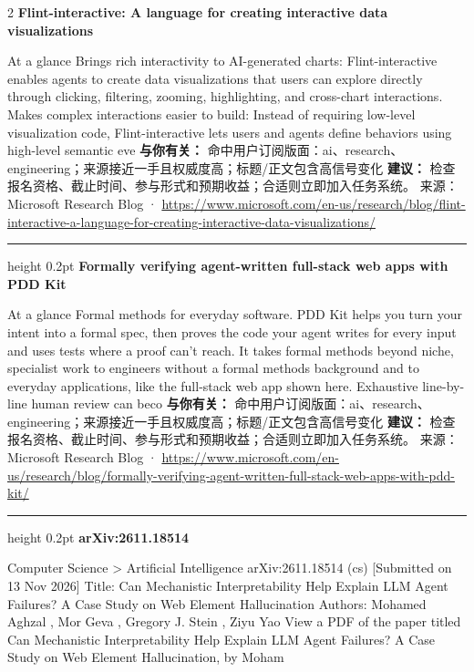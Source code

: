\documentclass[10.5pt]{ctexart}
\begin{document}
\begin{multicols}{2}
{\large\bfseries Flint-interactive: A language for creating interactive data visualizations}\par
At a glance Brings rich interactivity to AI-generated charts: Flint-interactive enables agents to create data visualizations that users can explore directly through clicking, filtering, zooming, highlighting, and cross-chart interactions. Makes complex interactions easier to build: Instead of requiring low-level visualization code, Flint-interactive lets users and agents define behaviors using high-level semantic eve
\textbf{与你有关：} 命中用户订阅版面：ai、research、engineering；来源接近一手且权威度高；标题/正文包含高信号变化
\textbf{建议：} 检查报名资格、截止时间、参与形式和预期收益；合适则立即加入任务系统。
{\footnotesize\color{ormuted} 来源：Microsoft Research Blog · \url{https://www.microsoft.com/en-us/research/blog/flint-interactive-a-language-for-creating-interactive-data-visualizations/}}
\vspace{2mm}
\hrule height 0.2pt
\vspace{2mm}
{\large\bfseries Formally verifying agent-written full-stack web apps with PDD Kit}\par
At a glance Formal methods for everyday software. PDD Kit helps you turn your intent into a formal spec, then proves the code your agent writes for every input and uses tests where a proof can’t reach. It takes formal methods beyond niche, specialist work to engineers without a formal methods background and to everyday applications, like the full-stack web app shown here. Exhaustive line-by-line human review can beco
\textbf{与你有关：} 命中用户订阅版面：ai、research、engineering；来源接近一手且权威度高；标题/正文包含高信号变化
\textbf{建议：} 检查报名资格、截止时间、参与形式和预期收益；合适则立即加入任务系统。
{\footnotesize\color{ormuted} 来源：Microsoft Research Blog · \url{https://www.microsoft.com/en-us/research/blog/formally-verifying-agent-written-full-stack-web-apps-with-pdd-kit/}}
\vspace{2mm}
\hrule height 0.2pt
\vspace{2mm}
{\large\bfseries arXiv:2611.18514}\par
Computer Science > Artificial Intelligence arXiv:2611.18514 (cs) [Submitted on 13 Nov 2026] Title: Can Mechanistic Interpretability Help Explain LLM Agent Failures? A Case Study on Web Element Hallucination Authors: Mohamed Aghzal , Mor Geva , Gregory J. Stein , Ziyu Yao View a PDF of the paper titled Can Mechanistic Interpretability Help Explain LLM Agent Failures? A Case Study on Web Element Hallucination, by Moham

\end{multicols}
\end{document}
